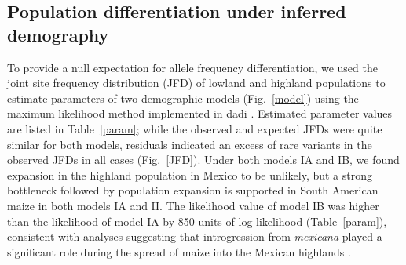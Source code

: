 \subsection*{Population differentiation under inferred demography}

To provide a null expectation for allele frequency differentiation, we used the joint site frequency distribution (JFD) of lowland and highland populations to estimate parameters of two demographic models (Fig.~\ref{model}) using the maximum likelihood method implemented in {\sf dadi} \citep{Gutenkunst_2009_19851460}.  
Estimated parameter values are listed in Table~\ref{param}; 
while the observed and expected JFDs were quite similar for both models,  
residuals indicated an excess of rare variants in the observed JFDs in all cases (Fig.~\ref{JFD}). 
Under both models IA and IB,  we found expansion in the highland population in Mexico to be unlikely, but a strong bottleneck followed by population expansion is supported in South American maize in both models IA and II.  
The likelihood value of model IB was higher than the likelihood of model IA by 850 units of log-likelihood (Table~\ref{param}), 
consistent with analyses suggesting that introgression from \textit{mexicana} played a significant role during the spread of maize into the Mexican highlands \citep{Profford_2013}. 


